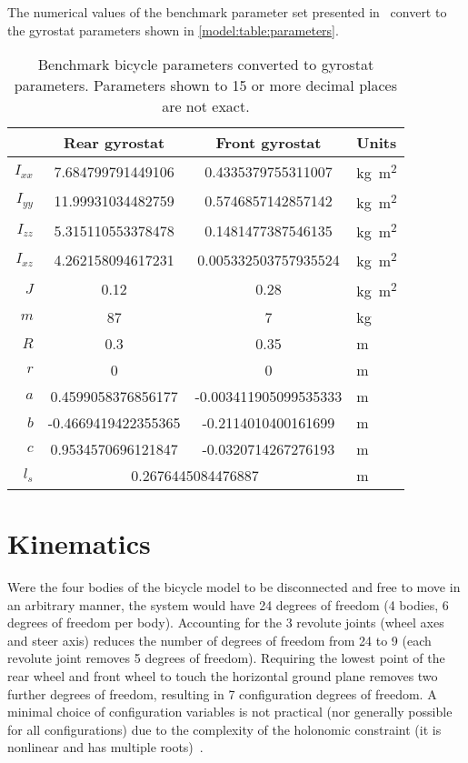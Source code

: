 The numerical values of the benchmark parameter set presented
in~\cite{Meijaard2007} convert to the gyrostat parameters shown in
\autoref{model:table:parameters}.

\begin{table}[htbp]
  \centering
  \begin{tabular}{rccl}
    \toprule
    & {Rear gyrostat} & {Front gyrostat} & {Units} \\
    \midrule
    $I_{xx}$ &   7.684799791449106 &    0.4335379755311007  & \si{\kg\m\squared} \\
    $I_{yy}$ &   11.99931034482759 &    0.5746857142857142  & \si{\kg\m\squared} \\
    $I_{zz}$ &   5.315110553378478 &    0.1481477387546135  & \si{\kg\m\squared} \\
    $I_{xz}$ &   4.262158094617231 &  0.005332503757935524  & \si{\kg\m\squared} \\
         $J$ &                0.12 &                  0.28  & \si{\kg\m\squared} \\
         $m$ &                  87 &                     7  & \si{\kg}     \\
         $R$ &                 0.3 &                  0.35  & \si{\m}      \\
         $r$ &                   0 &                     0  & \si{\m}\\
         $a$ &  0.4599058376856177 & -0.003411905099535333  & \si{\m}\\
         $b$ & -0.4669419422355365 &   -0.2114010400161699  & \si{\m}\\
         $c$ &  0.9534570696121847 &   -0.0320714267276193  & \si{\m}\\
         $l_s$ & \multicolumn{2}{c}{0.2676445084476887} &  \si{\m} \\
  \bottomrule
  \end{tabular}
  \caption[Benchmark bicycle parameters converted to gyrostat
    parameters.]{Benchmark bicycle parameters converted to gyrostat parameters.
    Parameters shown to 15 or more decimal places are not exact.}
  \label{model:table:parameters}
\end{table}

\section{Kinematics} \label{model:kinematics}

Were the four bodies of the bicycle model to be disconnected and free to move
in an arbitrary manner, the system would have 24 degrees of freedom (4 bodies,
6 degrees of freedom per body). Accounting for the 3 revolute joints (wheel
axes and steer axis) reduces the number of degrees of freedom from 24 to 9
(each revolute joint removes 5 degrees of freedom). Requiring the lowest point
of the rear wheel and front wheel to touch the horizontal ground plane removes
two further degrees of freedom, resulting in 7 configuration degrees of
freedom. A minimal choice of configuration variables is not practical (nor
generally possible for all configurations) due to the complexity of the
holonomic constraint (it is nonlinear and has multiple
roots)~\cite{Peterson2008a}.

